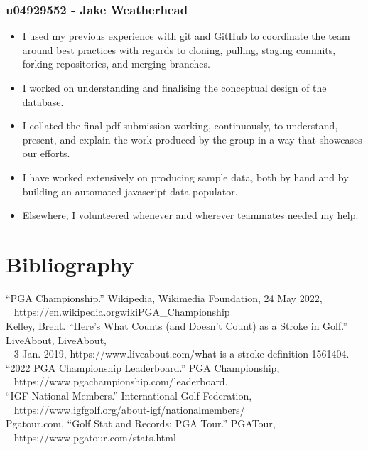 \documentclass[titlepage]{article}
\begin{document}
\subsubsection*{u04929552 - Jake Weatherhead}
\vspace{1em}
\begin{itemize}
  \item I used my previous experience with git and GitHub to coordinate the team around best practices with regards to cloning, 
        pulling, staging commits, forking repositories, and merging branches.
  \item I worked on understanding and finalising the conceptual design of the database.
  \item I collated the final pdf submission working, continuously, to understand, present, and explain the work produced
        by the group in a way that showcases our efforts.
  \item I have worked extensively on producing sample data, both by hand and by building an automated javascript data populator.
  \item Elsewhere, I volunteered whenever and wherever teammates needed my help.
\end{itemize}

\newpage
\section{Bibliography}
\vspace{2em}
“PGA Championship.” Wikipedia, Wikimedia Foundation, 24 May 2022, \\
\-\ \hspace{15pt} https://en.wikipedia.org\/wiki\/PGA\_Championship \\

\noindent
Kelley, Brent. “Here's What Counts (and Doesn't Count) as a Stroke in Golf.” LiveAbout, LiveAbout, \\
\-\ \hspace{15pt} 3 Jan. 2019, https://www.liveabout.com/what-is-a-stroke-definition-1561404. \\

\noindent
“2022 PGA Championship Leaderboard.” PGA Championship, \\
\-\ \hspace{15pt} https://www.pgachampionship.com/leaderboard. \\

\noindent
“IGF National Members.” International Golf Federation, \\ 
\-\ \hspace{15pt} https://www.igfgolf.org/about-igf/nationalmembers/ \\ 

\noindent
Pgatour.com. “Golf Stat and Records: PGA Tour.” PGATour, \\
\-\ \hspace{15pt} https://www.pgatour.com/stats.html \\
\end{document}
